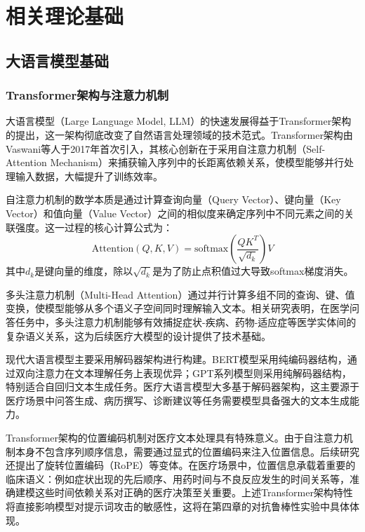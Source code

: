 
\chapter{相关理论基础}
\label{cha:background}

\section{大语言模型基础}
\label{sec:llm_basis}

\subsection{Transformer架构与注意力机制}
\label{subsec:transformer}

大语言模型（Large Language Model, LLM）的快速发展得益于Transformer架构的提出，这一架构彻底改变了自然语言处理领域的技术范式。Transformer架构由Vaswani等人\cite{vaswani2017attention}于2017年首次引入，其核心创新在于采用自注意力机制（Self-Attention Mechanism）来捕获输入序列中的长距离依赖关系，使模型能够并行处理输入数据，大幅提升了训练效率。

自注意力机制的数学本质是通过计算查询向量（Query Vector）、键向量（Key Vector）和值向量（Value Vector）之间的相似度来确定序列中不同元素之间的关联强度。这一过程的核心计算公式为：
\begin{equation}
\text{Attention}(Q, K, V) = \text{softmax}\left(\frac{QK^T}{\sqrt{d_k}}\right)V
\label{eq:attention}
\end{equation}
其中$d_k$是键向量的维度，除以$\sqrt{d_k}$是为了防止点积值过大导致softmax梯度消失。

多头注意力机制（Multi-Head Attention）通过并行计算多组不同的查询、键、值变换，使模型能够从多个语义子空间同时理解输入文本。相关研究表明\cite{lee2020biobert,jin2021medqa}，在医学问答任务中，多头注意力机制能够有效捕捉症状-疾病、药物-适应症等医学实体间的复杂语义关系，这为后续医疗大模型的设计提供了技术基础。

现代大语言模型主要采用解码器架构进行构建。BERT模型\cite{devlin2018bert}采用纯编码器结构，通过双向注意力在文本理解任务上表现优异；GPT系列模型\cite{brown2020language,achiam2023gpt}则采用纯解码器结构，特别适合自回归文本生成任务。医疗大语言模型大多基于解码器架构，这主要源于医疗场景中问答生成、病历撰写、诊断建议等任务需要模型具备强大的文本生成能力。

Transformer架构的位置编码机制对医疗文本处理具有特殊意义。由于自注意力机制本身不包含序列顺序信息，需要通过显式的位置编码来注入位置信息\cite{vaswani2017attention}。后续研究还提出了旋转位置编码（RoPE）等变体\cite{su2021roformer}。在医疗场景中，位置信息承载着重要的临床语义：例如症状出现的先后顺序、用药时间与不良反应发生的时间关系等，准确建模这些时间依赖关系对正确的医疗决策至关重要。上述Transformer架构特性将直接影响模型对提示词攻击的敏感性，这将在第四章的对抗鲁棒性实验中具体体现。

